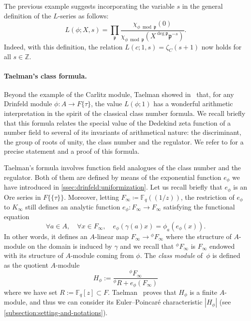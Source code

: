 \documentclass[11pt]{article}
\theoremstyle{definition}
\newcommand\Fq{\mathbb{F}_q}
\newcommand\Z{\mathbb{Z}}
\newcommand{\p}{\mathfrak{p}}
\newcommand{\phiact}[1]{{}^\phi\! #1}
\begin{document}
The previous example suggests incorporating the variable $s$ in the general definition of the $L$-series as follows:
\begin{equation}
\label{eq:arith:defLseries}
L(\phi; X, s) = \prod_{\p} 
  \frac{\chi_{\phi \bmod \p}(0)}{\chi_{\phi \bmod \p}(X^{\deg \p}\p^{-s})}.
\end{equation}
Indeed, with this definition, the relation $L(c; 1, s) = \zeta_C(s+1)$
now holds for all $s \in \Z$.

\paragraph{Taelman's class formula.}

Beyond the example of the Carlitz module, Taelman showed 
in~\cite{Taelman12} that, for any Drinfeld module $\phi : A \to 
F\{\tau\}$, the value $L(\phi; 1)$ has a wonderful arithmetic 
interpretation in the spirit of the classical class number formula.
We recall briefly that this formula relates the special value of the Dedekind zeta 
function of a number field to several of its invariants of arithmetical nature:
the discriminant, the group of roots of unity, the class number and the regulator.
We refer to \cite[Chapter~VII, Corollary~5.11]{Neukirch99} for a precise statement and a proof of this formula.

Taelman's formula involves function field analogues of the class number
and the regulator.
Both of them are defined by means of the exponential function $e_\phi$
we have introduced in \cref{ssec:drinfeld:uniformization}. 
Let us recall briefly that $e_\phi$ is an Ore series in 
$F\{\!\{\tau\}\!\}$. Moreover, letting $F_\infty \coloneqq \Fq(\!(1/z)\!)$, the restriction of $e_\phi$ to $K_\infty$ still defines
an analytic function $e_\phi : F_\infty \to F_\infty$ satisfying the 
functional equation
$$\forall a \in A, \quad \forall x \in F_\infty, \quad e_\phi(\gamma(a)x) = 
\phi_a(e_\phi(x)).$$ 
In other words, it defines an $A$-linear map $F_\infty \to 
\phiact{F_\infty}$ where the structure of $A$-module on the 
domain is induced by $\gamma$ and we recall that $\phiact{F_\infty}$ 
is $F_\infty$ endowed with its structure of $A$-module coming from
$\phi$.
The \emph{class module} of~$\phi$ is defined as the quotient
$A$-module
$$H_{\phi} := \frac{\phiact{F_\infty}}{\phiact{R} + e_\phi(F_\infty)}$$
where we have set $R := \Fq[z] \subset F$. Taelman~\cite[Proposition~5]{Taelman12} proves that $H_{\phi}$ is a finite 
$A$-module, and thus we can consider its Euler--Poincaré characteristic
$|H_{\phi}|$ (see \cref{subsection:setting-and-notations}).
\end{document}
